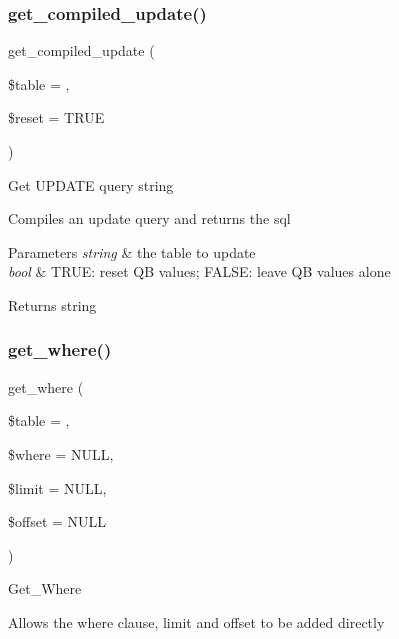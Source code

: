\subsubsection{\texorpdfstring{get\+\_\+compiled\+\_\+update()}{get\_compiled\_update()}}
{\footnotesize\ttfamily get\+\_\+compiled\+\_\+update (\begin{DoxyParamCaption}\item[{}]{\$table = {\ttfamily \textquotesingle{}\textquotesingle{}},  }\item[{}]{\$reset = {\ttfamily TRUE} }\end{DoxyParamCaption})}

Get U\+P\+D\+A\+TE query string

Compiles an update query and returns the sql


\begin{DoxyParams}{Parameters}
{\em string} & the table to update \\
\hline
{\em bool} & T\+R\+UE\+: reset QB values; F\+A\+L\+SE\+: leave QB values alone \\
\hline
\end{DoxyParams}
\begin{DoxyReturn}{Returns}
string 
\end{DoxyReturn}
\mbox{\label{class_c_i___d_b__query__builder_a8cae750fdc32b3c91544c091673fd17b}} 
\subsubsection{\texorpdfstring{get\+\_\+where()}{get\_where()}}
{\footnotesize\ttfamily get\+\_\+where (\begin{DoxyParamCaption}\item[{}]{\$table = {\ttfamily \textquotesingle{}\textquotesingle{}},  }\item[{}]{\$where = {\ttfamily NULL},  }\item[{}]{\$limit = {\ttfamily NULL},  }\item[{}]{\$offset = {\ttfamily NULL} }\end{DoxyParamCaption})}

Get\+\_\+\+Where

Allows the where clause, limit and offset to be added directly


